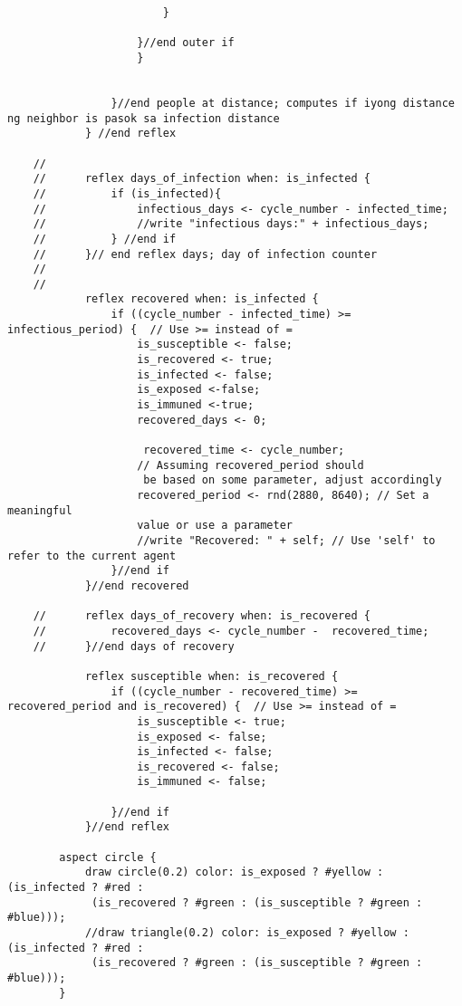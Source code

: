 \begin{lstlisting}
                        }
                        
                    }//end outer if	
                    }
                    
                    
                }//end people at distance; computes if iyong distance ng neighbor is pasok sa infection distance 
            } //end reflex
            
    //		   
    //		reflex days_of_infection when: is_infected {
    //			if (is_infected){
    //				infectious_days <- cycle_number - infected_time;
    //		   		//write "infectious days:" + infectious_days;
    //		   	} //end if
    //		}// end reflex days; day of infection counter
    //	
    //	
            reflex recovered when: is_infected {
                if ((cycle_number - infected_time) >= infectious_period) {  // Use >= instead of =
                    is_susceptible <- false;
                    is_recovered <- true;
                    is_infected <- false;
                    is_exposed <-false;
                    is_immuned <-true;
                    recovered_days <- 0;
                        
                     recovered_time <- cycle_number;
                    // Assuming recovered_period should
                     be based on some parameter, adjust accordingly
                    recovered_period <- rnd(2880, 8640); // Set a meaningful 
                    value or use a parameter 
                    //write "Recovered: " + self; // Use 'self' to refer to the current agent
                }//end if
            }//end recovered
                
    //		reflex days_of_recovery when: is_recovered {
    //			recovered_days <- cycle_number -  recovered_time;
    //		}//end days of recovery
                
            reflex susceptible when: is_recovered {
                if ((cycle_number - recovered_time) >= recovered_period and is_recovered) {  // Use >= instead of =
                    is_susceptible <- true;
                    is_exposed <- false;
                    is_infected <- false;
                    is_recovered <- false;
                    is_immuned <- false;
                    
                }//end if
            }//end reflex
        
        aspect circle {
            draw circle(0.2) color: is_exposed ? #yellow : (is_infected ? #red :
             (is_recovered ? #green : (is_susceptible ? #green : #blue)));
            //draw triangle(0.2) color: is_exposed ? #yellow : (is_infected ? #red :
             (is_recovered ? #green : (is_susceptible ? #green : #blue)));
        }	
        

\end{lstlisting}
